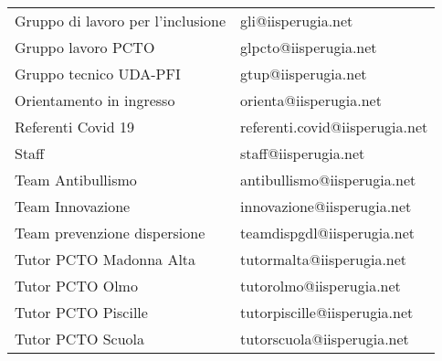 \begin{center}
\begin{tabular}{ll}
Gruppo di lavoro per l'inclusione&
gli@iisperugia.net\\
Gruppo lavoro PCTO&
glpcto@iisperugia.net\\
Gruppo tecnico UDA-PFI&
gtup@iisperugia.net\\
Orientamento in ingresso&
orienta@iisperugia.net\\
Referenti Covid 19&
referenti.covid@iisperugia.net\\
Staff&
staff@iisperugia.net\\
Team Antibullismo &
antibullismo@iisperugia.net\\
Team Innovazione&
innovazione@iisperugia.net\\
Team prevenzione dispersione&
teamdispgdl@iisperugia.net\\
Tutor PCTO Madonna Alta&
tutormalta@iisperugia.net\\
Tutor PCTO Olmo&
tutorolmo@iisperugia.net\\
Tutor PCTO Piscille &
tutorpiscille@iisperugia.net\\
Tutor PCTO Scuola&
tutorscuola@iisperugia.net\\
\midrule
\end{tabular}
\end{center}


